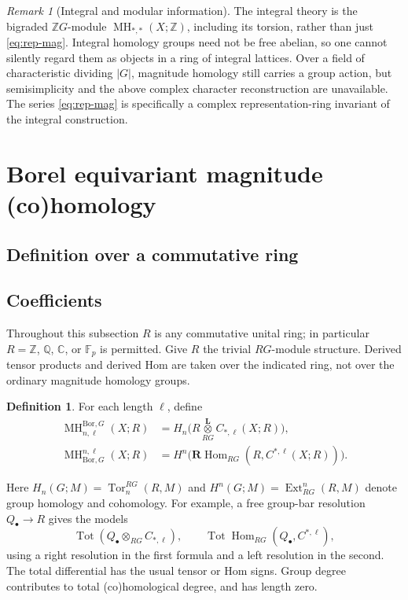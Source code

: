 \documentclass[11pt,a4paper]{article}
\numberwithin{equation}{section}
\theoremstyle{definition}
\newtheorem{definition}[theorem]{Definition}
\theoremstyle{remark}
\newtheorem{remark}[theorem]{Remark}
\newcommand{\Z}{\mathbb Z}
\newcommand{\Q}{\mathbb Q}
\newcommand{\C}{\mathbb C}
\newcommand{\F}{\mathbb F}
\newcommand{\G}{G}
\newcommand{\MH}{\operatorname{MH}}
\newcommand{\Tor}{\operatorname{Tor}}
\newcommand{\Ext}{\operatorname{Ext}}
\newcommand{\Hom}{\operatorname{Hom}}
\newcommand{\RHom}{\mathbf{R}\!\operatorname{Hom}}
\newcommand{\Tot}{\operatorname{Tot}}
\newcommand{\derivedtensor}[1]{\mathbin{\mathop{\otimes}\limits^{\mathbf L}_{#1}}}
\newcommand{\Bor}{\mathrm{Bor}}
\newcommand{\coeff}{\subsection*{\color{darkblue}Coefficients}}
\begin{document}
\begin{remark}[Integral and modular information]
The integral theory is the bigraded $\Z\G$-module
$\MH_{*,*}(X;\Z)$, including its torsion, rather than just
\eqref{eq:rep-mag}.  Integral homology groups need not be free abelian,
so one cannot silently regard them as objects in a ring of integral
lattices.  Over a field of characteristic dividing $|\G|$, magnitude
homology still carries a group action, but semisimplicity and the above
complex character reconstruction are unavailable.  The series
\eqref{eq:rep-mag} is specifically a complex representation-ring
invariant of the integral construction.
\end{remark}

\section{Borel equivariant magnitude (co)homology}
\label{sec:borel}

\subsection{Definition over a commutative ring}

\coeff Throughout this subsection $R$ is any commutative unital ring;
in particular $R=\Z$, $\Q$, $\C$, or $\F_p$ is permitted.  Give $R$
the trivial $R\G$-module structure.  Derived tensor products and derived
Hom are taken over the indicated ring, not over the ordinary magnitude
homology groups.

\begin{definition}\label{def:borel}
 For each length $\ell$, define
 \begin{align}
 \MH^{\Bor,\G}_{n,\ell}(X;R)
   &=H_n\bigl(R\derivedtensor{R\G}C_{*,\ell}(X;R)\bigr),\label{eq:borel-hom}\\
 \MH^{n,\ell}_{\Bor,\G}(X;R)
   &=H^n\bigl(\RHom_{R\G}(R,C^{*,\ell}(X;R))\bigr).
      \label{eq:borel-cohom}
 \end{align}
\end{definition}
Here $H_n(\G;M)=\Tor_n^{R\G}(R,M)$ and
$H^n(\G;M)=\Ext_{R\G}^n(R,M)$ denote group homology and cohomology.
For example, a free group-bar resolution $Q_\bullet\to R$ gives the
models
\[
 \Tot(Q_\bullet\otimes_{R\G}C_{*,\ell}),\qquad
 \Tot\Hom_{R\G}(Q_\bullet,C^{*,\ell}),
\]
using a right resolution in the first formula and a left resolution in
the second.  The total differential has the usual tensor or Hom signs.
Group degree contributes to total (co)homological degree, and has
length zero.
\end{document}
